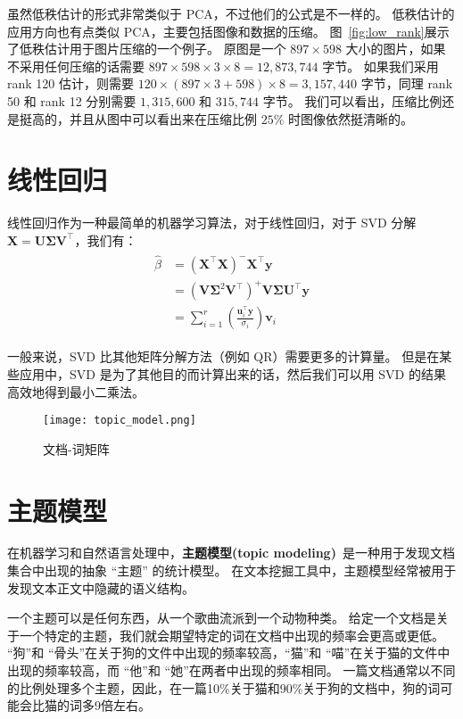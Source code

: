虽然低秩估计的形式非常类似于 PCA，不过他们的公式是不一样的。
低秩估计的应用方向也有点类似 PCA，主要包括图像和数据的压缩。
图~\ref{fig:low_rank}展示了低秩估计用于图片压缩的一个例子。
原图是一个 $897 \times 598$ 大小的图片，如果不采用任何压缩的话需要 $897 \times 598 \times 3 \times 8 = 12,873,744$ 字节。
如果我们采用 rank 120 估计，则需要 $120 \times (897 \times 3 + 598) \times 8 = 3,157,440$ 字节，同理 rank 50 和 rank 12 分别需要 $1,315,600$ 和 $315,744$ 字节。
我们可以看出，压缩比例还是挺高的，并且从图中可以看出来在压缩比例 $25\%$ 时图像依然挺清晰的。

\section{线性回归}
线性回归作为一种最简单的机器学习算法，对于线性回归，对于 SVD 分解 $\bm{X} = \bm{U\Sigma}\bm{V}^\top$，我们有：
\begin{align}
	\begin{split}
		\hat{\beta} &= (\bm{X}^\top\bm{X})^-\bm{X}^\top\bm{y} \\
		&= (\bm{V\Sigma}^2\bm{V}^\top)^+\bm{V\Sigma U}^\top\bm{y} \\
		&= \sum_{i=1}^r \left(\frac{\bm{u}_i^\top \bm{y}}{\sigma_i}\right)\bm{v}_i
	\end{split}
\end{align}

一般来说，SVD 比其他矩阵分解方法（例如 QR）需要更多的计算量。
但是在某些应用中，SVD 是为了其他目的而计算出来的话，然后我们可以用 SVD 的结果高效地得到最小二乘法。

\begin{figure}[H]
	\centering
	\texttt{[image: topic\_model.png]}
	\caption{文档-词矩阵}
	\label{fig:topic_model}
\end{figure}

\section{主题模型}
在机器学习和自然语言处理中，\textbf{主题模型(topic modeling)}~\cite{topic_model}是一种用于发现文档集合中出现的抽象 “主题” 的统计模型。
在文本挖掘工具中，主题模型经常被用于发现文本正文中隐藏的语义结构。

一个主题可以是任何东西，从一个歌曲流派到一个动物种类。
给定一个文档是关于一个特定的主题，我们就会期望特定的词在文档中出现的频率会更高或更低。
“狗”和 “骨头”在关于狗的文件中出现的频率较高，“猫”和 “喵”在关于猫的文件中出现的频率较高，而 “他”和 “她”在两者中出现的频率相同。
一篇文档通常以不同的比例处理多个主题，因此，在一篇10\%关于猫和90\%关于狗的文档中，狗的词可能会比猫的词多9倍左右。

